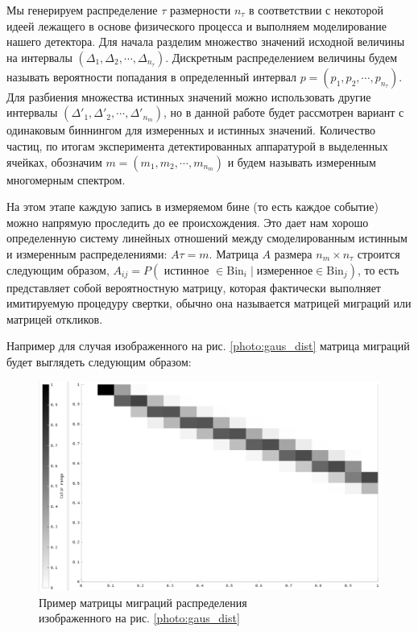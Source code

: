 \documentclass[a4paper,12pt]{diplom}
\begin{document}
Мы генерируем распределение $\tau$ размерности $n_{\tau}$ в соответствии с некоторой идеей лежащего в основе физического процесса и 
выполняем моделирование нашего детектора. Для начала разделим множество значений исходной величины на интервалы 
$(\Delta_{1}, \Delta_{2}, \cdots ,\Delta_{n_{\tau}})$. Дискретным распределением величины будем называть вероятности попадания 
в определенный интервал $p = (p_{1}, p_{2}, \cdots, p_{n_{\tau}})$. Для разбиения множества истинных значений можно использовать 
другие интервалы $(\Delta'_{1}, \Delta'_{2}, \cdots ,\Delta'_{n_{m}})$, но в данной работе будет рассмотрен вариант с одинаковым 
биннингом для измеренных и истинных значений. Количество частиц, по итогам эксперимента детектированных аппаратурой в выделенных 
ячейках, обозначим $m = (m_{1}, m_{2}, \cdots, m_{n_{m}})$ и будем называть измеренным многомерным спектром. 


На этом этапе каждую запись в измеряемом бине (то есть каждое событие) можно напрямую проследить до ее происхождения. 
Это дает нам хорошо определенную систему линейных отношений между смоделированным истинным и измеренным распределениями: 
$A\tau = m$. Матрица $A$ размера $n_{m} \times n_{\tau}$ строится следующим образом, 
$A_{ij} = P( \text{ истинное } \in \text{Bin}_{i} \mid \text{измеренное} \in \text{Bin}_{j} )$, 
то есть представляет собой вероятностную матрицу, которая фактически выполняет имитируемую процедуру свертки, обычно она называется матрицей
миграций или матрицей откликов.

Например для случая изображенного на рис. \eqref{photo:gaus_dist} матрица миграций будет выглядеть следующим образом:

\begin{figure}[!ht]
   \includegraphics[width=\linewidth]{images/gaus_mig_black.png}
   \caption{Пример матрицы миграций распределения \\ изображенного на рис. \eqref{photo:gaus_dist} }
   \label{photo:gaus_mig}
\end{figure}
\end{document}

